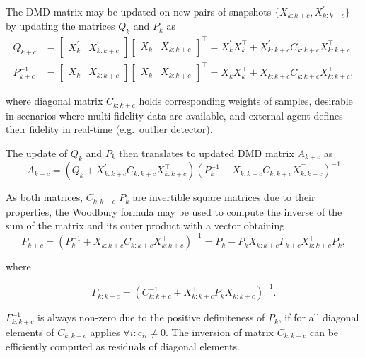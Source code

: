The DMD matrix may be updated on new pairs of snapshots \( \{X_{k: k + c}, X^\prime_{k: k + c}\} \) by updating the matrices \(Q_k\) and \(P_k\) as
\begin{align*}
    Q_{k+c}      & = \begin{bmatrix} X^\prime_k  & X^\prime_{k : k + c} \end{bmatrix} \begin{bmatrix} X_{k} & X_{k : k + c} \end{bmatrix}^\top = X^\prime_k X_{k}^\top + X^\prime_{k : k + c} C_{k : k + c} X_{k : k + c}^\top \\
    P^{-1}_{k+c} & = \begin{bmatrix} X_{k} & X_{k : k + c} \end{bmatrix} \begin{bmatrix} X_{k} & X_{k : k + c} \end{bmatrix}^\top = X_{k}X_{k}^\top + X_{k : k + c} C_{k : k + c} X_{k : k + c}^\top,
\end{align*}

where diagonal matrix \(C_{k: k + c}\) holds corresponding weights of samples, desirable in scenarios where multi-fidelity data are available, and external agent defines their fidelity in real-time (e.g.~outlier detector).

The update of \(Q_k\) and \(P_k\) then translates to updated DMD matrix \(A_{k+c}\) as
\begin{equation}
    A_{k+c} = (Q_k + X^\prime_{k : k + c} C_{k : k + c} X_{k : k + c}^\top) {(P_k^{-1} + X_{k : k + c} C_{k : k + c} X_{k : k + c}^\top)}^{-1}
\end{equation}

As both matrices, \(C_{k: k + c}\) \(P_k\) are invertible square matrices due to their properties, the Woodbury formula may be used to compute the inverse of the sum of the matrix and its outer product with a vector obtaining
\begin{equation}\label{eq:precision-matrix-update}
    P_{k+c} = {(P_k^{-1} + X_{k : k + c} C_{k : k + c} X_{k : k + c}^\top)}^{-1} = P_k - P_k X_{k : k + c} \Gamma_{k+c} X_{k : k + c}^\top P_k,
\end{equation}

where

\begin{equation}
    \Gamma_{k : k + c} = {(C_{k : k + c}^{-1} + X_{k : k + c}^\top P_k X_{k : k + c})}^{-1}.
\end{equation}

\(\Gamma_{k : k + c}^{-1}\) is always non-zero due to the positive definiteness of \(P_k\), if for all diagonal elements of \(C_{k : k + c}\) applies \( \forall i : c_{ii} \neq 0 \). The inversion of matrix \(C_{k: k + c}\) can be efficiently computed as residuals of diagonal elements.

